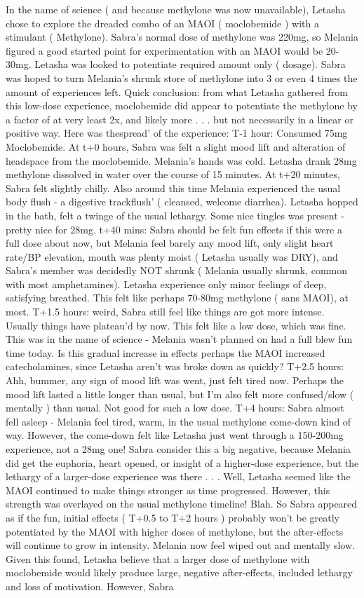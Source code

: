 \documentclass[12pt]{book}
\begin{document}
In the name of science ( and because methylone was now unavailable), Letasha chose to explore the dreaded combo of an MAOI ( moclobemide ) with a stimulant ( Methylone). Sabra's normal dose of methylone was 220mg, so Melania figured a good started point for experimentation with an MAOI would be 20-30mg. Letasha was looked to potentiate required amount only ( dosage). Sabra was hoped to turn Melania's shrunk store of methylone into 3 or even 4 times the amount of experiences left. Quick conclusion: from what Letasha gathered from this low-dose experience, moclobemide did appear to potentiate the methylone by a factor of at very least 2x, and likely more . . .  but not necessarily in a linear or positive way. Here was thespread' of the experience: T-1 hour: Consumed 75mg Moclobemide. At t+0 hours, Sabra was felt a slight mood lift and alteration of headspace from the moclobemide. Melania's hands was cold. Letasha drank 28mg methylone dissolved in water over the course of 15 minutes. At t+20 minutes, Sabra felt slightly chilly. Also around this time Melania experienced the usual body flush - a digestive trackflush' ( cleansed, welcome diarrhea). Letasha hopped in the bath, felt a twinge of the usual lethargy. Some nice tingles was present - pretty nice for 28mg. t+40 mins: Sabra should be felt fun effects if this were a full dose about now, but Melania feel barely any mood lift, only slight heart rate/BP elevation, mouth was plenty moist ( Letasha usually was DRY), and Sabra's member was decidedly NOT shrunk ( Melania usually shrunk, common with most amphetamines). Letasha experience only minor feelings of deep, satisfying breathed. This felt like perhaps 70-80mg methylone ( sans MAOI), at most. T+1.5 hours: weird, Sabra still feel like things are got more intense. Usually things have plateau'd by now. This felt like a low dose, which was fine. This was in the name of science - Melania wasn't planned on had a full blew fun time today. Is this gradual increase in effects perhaps the MAOI increased catecholamines, since Letasha aren't was broke down as quickly? T+2.5 hours: Ahh, bummer, any sign of mood lift was went, just felt tired now. Perhaps the mood lift lasted a little longer than usual, but I'm also felt more confused/slow ( mentally ) than usual. Not good for such a low dose. T+4 hours: Sabra almost fell asleep - Melania feel tired, warm, in the usual methylone come-down kind of way. However, the come-down felt like Letasha just went through a 150-200mg experience, not a 28mg one! Sabra consider this a big negative, because Melania did get the euphoria, heart opened, or insight of a higher-dose experience, but the lethargy of a larger-dose experience was there . . .  Well, Letasha seemed like the MAOI continued to make things stronger as time progressed. However, this strength was overlayed on the usual methylone timeline! Blah. So Sabra appeared as if the fun, initial effects ( T+0.5 to T+2 hours ) probably won't be greatly potentiated by the MAOI with higher doses of methylone, but the after-effects will continue to grow in intensity. Melania now feel wiped out and mentally slow. Given this found, Letasha believe that a larger dose of methylone with moclobemide would likely produce large, negative after-effects, included lethargy and loss of motivation. However, Sabra 
\end{document}
